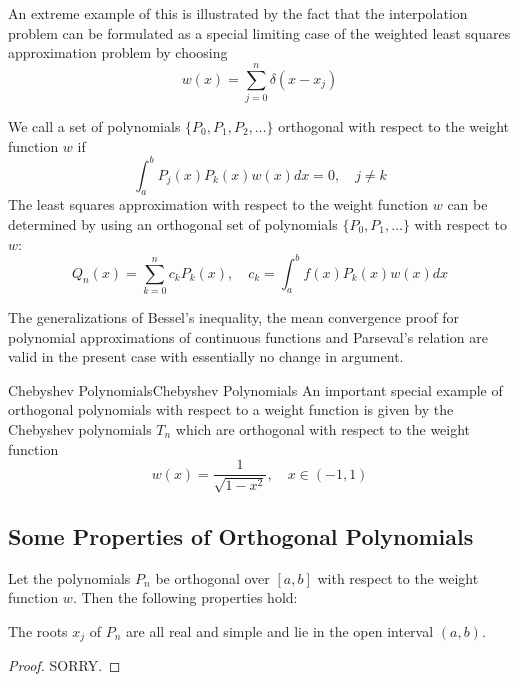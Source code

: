 \documentclass[../main.tex]{subfiles}
\begin{document}
\begin{remark}
	An extreme example of this is illustrated by the fact that the interpolation problem can be formulated as a special limiting case of the weighted least squares approximation problem by choosing
	\begin{equation*}
		w(x) = \sum_{j=0}^n \delta(x - x_j)
	\end{equation*}
\end{remark}

We call a set of polynomials $\{P_0, P_1, P_2, \dots\}$ orthogonal with respect to the weight function $w$ if
\begin{equation}
	\int_a^b P_j(x) P_k(x) w(x) dx = 0, \quad j \neq k
\end{equation}
The least squares approximation with respect to the weight function $w$ can be determined by using an orthogonal set of polynomials $\{P_0, P_1, \dots\}$ with respect to $w$:
\begin{equation}
	Q_n(x) = \sum_{k=0}^n c_k P_k(x), \quad c_k = \int_a^b f(x) P_k(x) w(x) dx
\end{equation}

The generalizations of Bessel's inequality, the mean convergence proof for polynomial approximations of continuous functions and Parseval's relation are valid in the present case with essentially no change in argument.
\begin{example}{Chebyshev Polynomials}{Chebyshev Polynomials}
	An important special example of orthogonal polynomials with respect to a weight function is given by the Chebyshev polynomials $T_n$ which are orthogonal with respect to the weight function
	\begin{equation}
		w(x) = \frac{1}{\sqrt{1 - x^2}}, \quad x \in (-1,1)
	\end{equation}
\end{example}

\subsection{Some Properties of Orthogonal Polynomials}
Let the polynomials $P_n$ be orthogonal over $[a,b]$ with respect to the weight function $w$. Then the following properties hold:
\begin{theorem}{}{}
	The roots $x_j$ of $P_n$ are all real and simple and lie in the open interval $(a,b)$.
\end{theorem}
\begin{proof}
	SORRY.
\end{proof}
\end{document}

